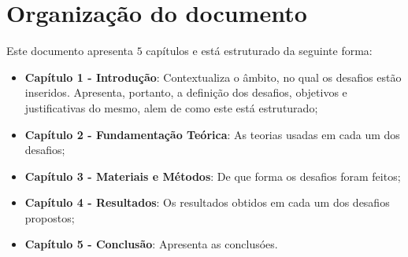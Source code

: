 \section{Organização do documento}
\label{section:organizacao}

Este documento apresenta $5$ capítulos e está estruturado da seguinte forma:

\begin{itemize}

  \item \textbf{Capítulo 1 - Introdução}: Contextualiza o âmbito, no qual os desafios estão inseridos. Apresenta, portanto, a definição dos desafios, objetivos e justificativas do mesmo, alem de como este \thetypeworkthree está estruturado;
  \item \textbf{Capítulo 2 - Fundamentação Teórica}: As teorias usadas em cada um dos desafios;
  \item \textbf{Capítulo 3 - Materiais e Métodos}: De que forma os desafios foram feitos;
  \item \textbf{Capítulo 4 - Resultados}: Os resultados obtidos em cada um dos desafios propostos;
  \item \textbf{Capítulo 5 - Conclusão}: Apresenta as conclusóes.

\end{itemize}
